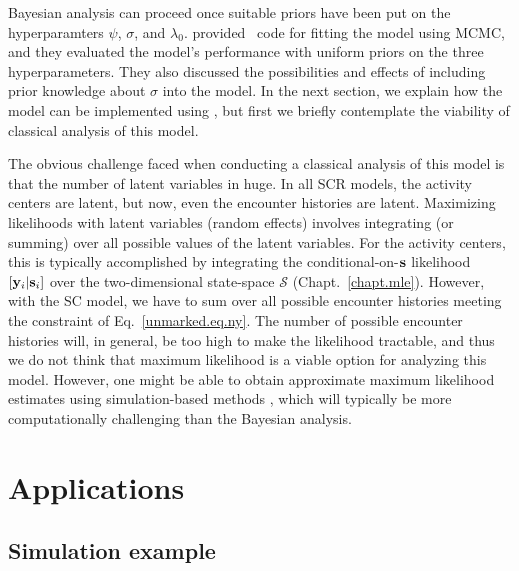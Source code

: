 Bayesian analysis can proceed once suitable priors have been put on
the hyperparamters $\psi$, $\sigma$, and
$\lambda_0$. \citet{chandler_royle:2012} provided \R~code for fitting
the model using MCMC, and they evaluated the model's performance with
uniform priors on the three hyperparameters. They also discussed the
possibilities and effects of including prior knowledge about $\sigma$
into the model. In the next section, we explain how the model can be
implemented using \jags, but first we briefly contemplate the viability of classical
analysis of this model.

The obvious challenge faced when conducting a classical analysis of
this model is that the number of latent variables in huge. In all SCR models, the activity centers are
latent, but now, even the encounter histories are latent.
Maximizing likelihoods with latent variables (random effects) involves
integrating (or summing) over all possible values of the latent
variables. For the activity centers, this is typically accomplished by
integrating the conditional-on-$\bf s$ likelihood $[{\bf y}_i|{\bf s}_i]$ over the two-dimensional
state-space $\mathcal{S}$ (Chapt.~\ref{chapt.mle}). However, with
the SC model, we have to sum
over all possible encounter histories %
meeting the constraint of Eq.~\ref{unmarked.eq.ny}. The
number of possible encounter histories
will, in general, be too high to make the likelihood tractable,
and thus we do not think that maximum likelihood is a viable option
for analyzing this model. However, one might be able to obtain
approximate maximum likelihood estimates using simulation-based methods
\citep{lele_etal:2010}, which will typically be more computationally
challenging than the Bayesian analysis.

\section{Applications}

\subsection{Simulation example}

